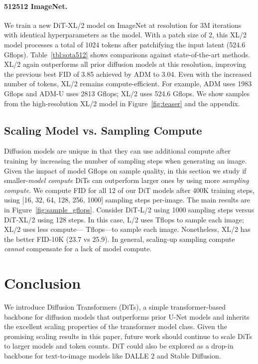 \documentclass[10pt,twocolumn,letterpaper]{article}
\begin{document}
\paragraph{512512 ImageNet.} 
We train a new DiT-XL/2 model on ImageNet at  resolution for 3M iterations with identical hyperparameters as the  model. With a patch size of 2, this XL/2 model processes a total of 1024 tokens after patchifying the  input latent (524.6 Gflops). Table~\ref{tbl:sota512} shows comparisons against state-of-the-art methods. XL/2 again outperforms all prior diffusion models at this resolution, improving the previous best FID of 3.85 achieved by ADM to 3.04. Even with the increased number of tokens, XL/2 remains compute-efficient. For example, ADM uses 1983 Gflops and ADM-U uses 2813 Gflops; XL/2 uses 524.6 Gflops. We show samples from the high-resolution XL/2 model in Figure~\ref{fig:teaser} and the appendix.

\subsection{Scaling Model vs. Sampling Compute}
Diffusion models are unique in that they can use additional compute after training by increasing the number of sampling steps when generating an image. Given the impact of model Gflops on sample quality, in this section we study if smaller-\textit{model compute} DiTs can outperform larger ones by using more \textit{sampling compute}. We compute FID for all 12 of our DiT models after 400K training steps, using [16, 32, 64, 128, 256, 1000] sampling steps per-image. The main results are in Figure~\ref{fig:sample_gflops}. Consider DiT-L/2 using 1000 sampling steps versus DiT-XL/2 using 128 steps. In this case, L/2 uses  Tflops to sample each image; XL/2 uses  less compute--- Tflops---to sample each image. Nonetheless, XL/2 has the better FID-10K (23.7 vs 25.9). In general, scaling-up sampling compute \textit{cannot} compensate for a lack of model compute.
\vspace{-1mm}

\section{Conclusion}
We introduce Diffusion Transformers (DiTs), a simple transformer-based backbone for diffusion models that outperforms prior U-Net models and inherits the excellent scaling properties of the transformer model class. Given the promising scaling results in this paper, future work should continue to scale DiTs to larger models and token counts. DiT could also be explored as a drop-in backbone for text-to-image models like DALLE 2 and Stable Diffusion.
\end{document}
